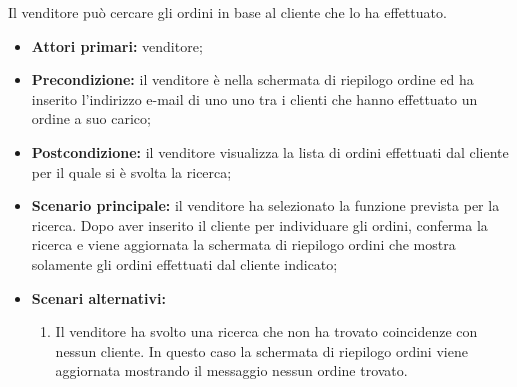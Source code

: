 Il venditore può cercare gli ordini in base al cliente che lo ha effettuato.
\begin{itemize}
	\item \textbf{Attori primari:} venditore;
	\item \textbf{Precondizione:} il venditore è nella schermata di riepilogo ordine ed ha inserito l'indirizzo e-mail di uno uno tra i clienti che hanno effettuato un ordine a suo carico;
	\item \textbf{Postcondizione:} il venditore visualizza la lista di ordini effettuati dal cliente per il quale si è svolta la ricerca;
	\item \textbf{Scenario principale:} il venditore ha selezionato la funzione prevista per la ricerca. Dopo aver inserito il cliente per individuare gli ordini, conferma la ricerca e viene aggiornata la schermata di riepilogo ordini che mostra solamente gli ordini effettuati dal cliente indicato;
	\item \textbf{Scenari alternativi:}
	\begin{enumerate}[label=\lett]
		\item Il venditore ha svolto una ricerca che non ha trovato coincidenze con nessun cliente. In questo caso la schermata di riepilogo ordini viene aggiornata mostrando il messaggio nessun ordine trovato.
	\end{enumerate}
\end{itemize}

